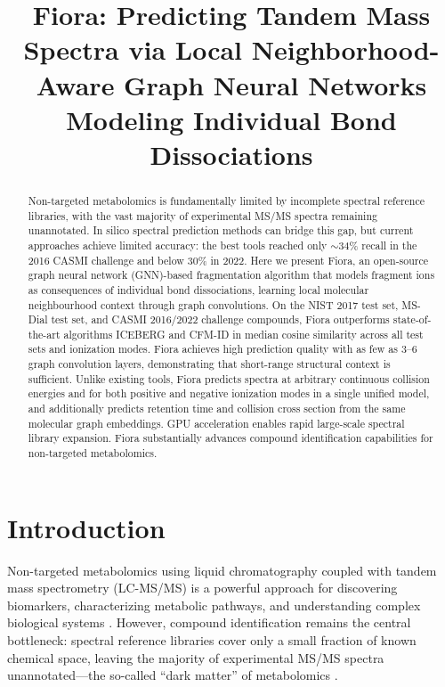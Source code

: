 \documentclass[11pt]{article}
\title{Fiora: Predicting Tandem Mass Spectra via Local Neighborhood-Aware Graph Neural Networks Modeling Individual Bond Dissociations}
\author{}
\date{}
\begin{document}
\maketitle

\begin{abstract}
Non-targeted metabolomics is fundamentally limited by incomplete spectral reference libraries, with the vast majority of experimental MS/MS spectra remaining unannotated. In silico spectral prediction methods can bridge this gap, but current approaches achieve limited accuracy: the best tools reached only $\sim$34\% recall in the 2016 CASMI challenge and below 30\% in 2022. Here we present Fiora, an open-source graph neural network (GNN)-based fragmentation algorithm that models fragment ions as consequences of individual bond dissociations, learning local molecular neighbourhood context through graph convolutions. On the NIST 2017 test set, MS-Dial test set, and CASMI 2016/2022 challenge compounds, Fiora outperforms state-of-the-art algorithms ICEBERG and CFM-ID in median cosine similarity across all test sets and ionization modes. Fiora achieves high prediction quality with as few as 3--6 graph convolution layers, demonstrating that short-range structural context is sufficient. Unlike existing tools, Fiora predicts spectra at arbitrary continuous collision energies and for both positive and negative ionization modes in a single unified model, and additionally predicts retention time and collision cross section from the same molecular graph embeddings. GPU acceleration enables rapid large-scale spectral library expansion. Fiora substantially advances compound identification capabilities for non-targeted metabolomics.
\end{abstract}

\section{Introduction}

Non-targeted metabolomics using liquid chromatography coupled with tandem mass spectrometry (LC-MS/MS) is a powerful approach for discovering biomarkers, characterizing metabolic pathways, and understanding complex biological systems \citep{wishart2019metabolomics,duhrkop2021systematic}. However, compound identification remains the central bottleneck: spectral reference libraries cover only a small fraction of known chemical space, leaving the majority of experimental MS/MS spectra unannotated---the so-called ``dark matter'' of metabolomics \citep{daSilva2015illuminating}.
\end{document}
